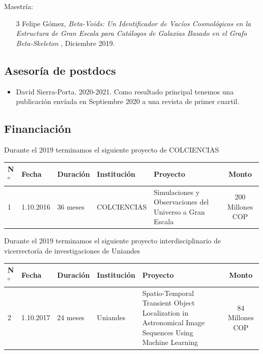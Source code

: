 \documentclass{article}
\begin{document}
Maestr\'ia:
\begin{itemize}
\item [3] Felipe G\'omez, \emph{Beta-Voids: Un Identificador de Vacíos Cosmológicos en la Estructura de Gran Escala para Catálogos de Galaxias Basado en el Grafo Beta-Skeleton
}, Diciembre 2019.
\end{itemize}


\subsection{Asesor\'ia de postdocs}

\begin{itemize}
\item David Sierra-Porta. 2020-2021. Como resultado principal tenemos una publicaci\'on env\'iada en Septiembre 2020 a una revista de primer cuartil.

\end{itemize}

\newpage
\subsection{Financiaci\'on}

Durante el 2019 terminamos el siguiente proyecto de COLCIENCIAS\\

\begin{tabular}{l l l p{2.4cm} p{4.0cm} c}\hline
N$^{o}$ & Fecha & Duraci\'on & Instituci\'on & Proyecto & Monto \\\hline

1 & 1.10.2016 & 36 meses & COLCIENCIAS & Simulaciones y Observaciones del Universo a Gran Escala & 200 Millones COP\\\hline
\end{tabular}

\vspace{0.5cm}

Durante el 2019 terminamos el siguiente proyecto interdisciplinario de vicerrector\'ia de investigaciones de Uniandes\\

\begin{tabular}{l l l p{2.4cm} p{4.0cm} c}\hline
N$^{o}$ & Fecha & Duraci\'on & Instituci\'on & Proyecto & Monto \\\hline
2 & 1.10.2017 & 24 meses & Uniandes & 
Spatio-Temporal Transient Object Localization in Astronomical Image
Sequences Using Machine Learning & 84 Millones COP \\
\end{tabular}
\end{document}

